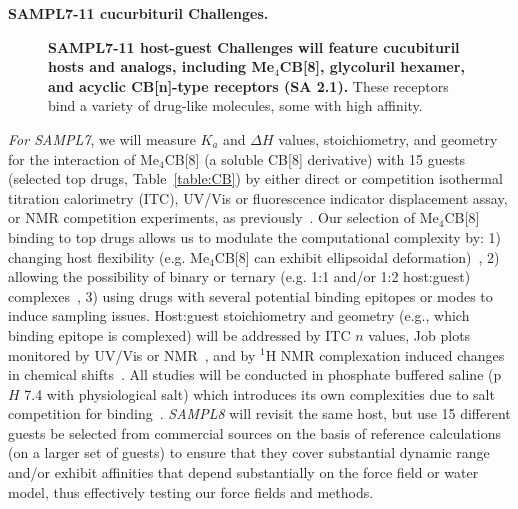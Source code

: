 \documentclass[11pt]{article}
\begin{document}
\textbf{SAMPL7-11 cucurbituril Challenges.} 


\begin{figure}[h]
\begin{centering}

\end{centering}

\caption{
\label{figure:CB} \footnotesize {\bf SAMPL7-11 host-guest Challenges will feature cucubituril hosts and analogs, including Me$_4$CB[8], glycoluril hexamer, and acyclic CB[n]-type receptors (SA 2.1).} 
These receptors bind a variety of drug-like molecules, some with high affinity.
\vspace{-0.2in}
}
\end{figure}


\emph{For SAMPL7}, we will measure $K_a$ and $\Delta H$ values, stoichiometry, and geometry for the interaction of Me$_4$CB[8] (a soluble CB[8] derivative) with 15 guests (selected top drugs, Table~\ref{table:CB}) by either direct or competition isothermal titration calorimetry (ITC), UV/Vis or fluorescence indicator displacement assay, or NMR competition experiments, as previously~\cite{cao_attomolar_2014, liu_cucurbituril_2005, ma_acyclic_2010, she_glycoluril-derived_2016}.  
Our selection of Me$_4$CB[8] binding to top drugs allows us to modulate the computational complexity by: 1) changing host flexibility (e.g. Me$_4$CB[8] can exhibit ellipsoidal deformation)~\cite{vinciguerra_synthesis_2015}, 2) allowing the possibility of binary or ternary (e.g. 1:1 and/or 1:2 host:guest) complexes~\cite{ko_supramolecular_2007, barrow_cucurbituril-based_2015, urbach_molecular_2011}, 3) using drugs with several potential binding epitopes or modes to induce sampling issues.  
Host:guest stoichiometry and geometry (e.g., which binding epitope is complexed) will be addressed by ITC $n$ values, Job plots monitored by UV/Vis or NMR~\cite{connors_binding_1987}, and by $^1$H NMR complexation induced changes in chemical shifts~\cite{masson_cucurbituril_2012}.  
All studies will be conducted in phosphate buffered saline (p$H$ 7.4 with physiological salt) which introduces its own complexities due to salt competition for binding~\cite{marquez_mechanism_2004, Mobley:2017:AnnualReviewofBiophysics}. 
\emph{SAMPL8} will revisit the same host, but use 15 different guests be selected from commercial sources on the basis of reference calculations (on a larger set of guests) to ensure that they cover substantial dynamic range and/or exhibit affinities that depend substantially on the force field or water model, thus effectively testing our force fields and methods.
\end{document}
